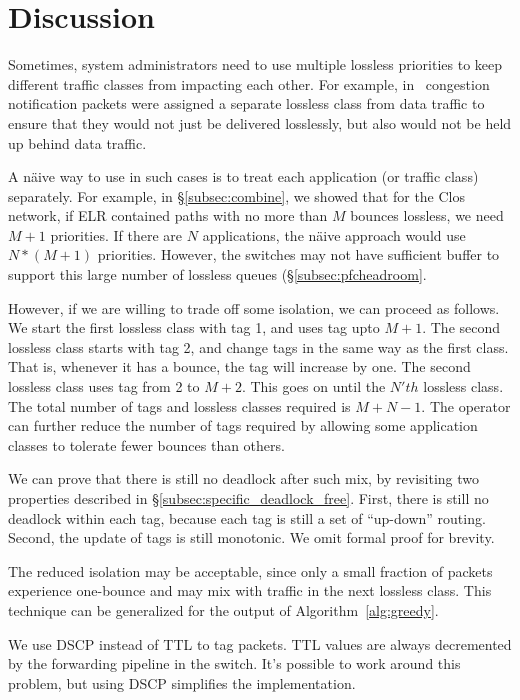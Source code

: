 \section{Discussion}

 Sometimes, system administrators need to
use multiple lossless priorities to keep different traffic classes from impacting each
other. For example, in~\cite{dcqcn} congestion notification packets were
assigned a separate lossless class from data traffic to ensure that they would
not just be delivered losslessly, but also would not be held up behind data
traffic.

A n{\"a}ive way to use \sysname{} in such cases is to treat each application (or
traffic class) separately.  For example, in \S\ref{subsec:combine}, we showed
that for the Clos network, if ELR contained paths with no more than $M$
bounces lossless, we need $M+1$ priorities. If there are $N$ applications, the
n{\"a}ive approach would use $N*(M+1)$ priorities.  However, the switches may
not have sufficient buffer to support this large number of lossless queues
(\S\ref{subsec:pfcheadroom}.

However, if we are willing to trade off some isolation, we can proceed as
follows.  We start the first lossless class with tag 1, and uses tag upto $M+1$.
The second lossless class starts with tag 2, and change tags in the same way as
the first class.  That is, whenever it has a bounce, the tag will increase by
one. The second lossless class uses tag from 2 to $M+2$. This goes on until the
$N'th$ lossless class. The total number of tags and lossless classes required is
$M + N -1$. The operator can further reduce the number of tags required by allowing
some application classes to tolerate fewer bounces than others.

We can prove that there is still no deadlock after such mix, by revisiting two
properties described in \S\ref{subsec:specific_deadlock_free}. First, there is
still no deadlock within each tag, because each tag is still a set of
``up-down'' routing. Second, the update of tags is still monotonic. We omit
formal proof for brevity.

The reduced isolation may be acceptable, since only a small fraction of
packets experience one-bounce and may mix with traffic in the next lossless
class.  This technique can be generalized for the output of
Algorithm~\ref{alg:greedy}. 

 We use DSCP instead of TTL to tag packets. TTL
values are always decremented by the forwarding pipeline in the switch. It's
possible to work around this problem, but using DSCP simplifies the
implementation.

